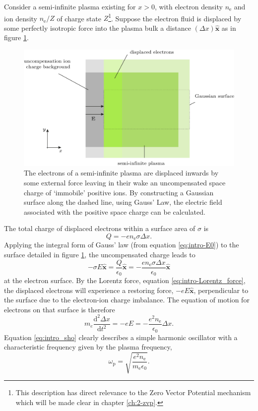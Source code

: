 Consider a semi-infinite plasma existing for $x>0$, with electron density $n_\mathrm{e}$ and ion density $n_\mathrm{e}/Z$ of charge state $Z$\footnote{This description has direct relevance to the Zero Vector Potential mechanism which will be made clear in chapter \ref{ch:2-zvp}.}. Suppose the electron fluid is displaced by some perfectly isotropic force into the plasma bulk a distance $(\Delta x) \hat{\mathbf{x}}$ as in figure \ref{fig:introplasmafrequency}. 
\begin{figure}
	\centering
	\includegraphics[width=0.7\linewidth]{figures/intro/intro_plasma_frequency}
	\caption[Diagram to illustrate the derivation of the plasma frequency.]{The electrons of a semi-infinite plasma are displaced inwards by some external force leaving in their wake an uncompensated space charge of `immobile' positive ions. By constructing a Gaussian surface along the dashed line, using Gauss' Law, the electric field associated with the positive space charge can be calculated.}
	\label{fig:introplasmafrequency}
\end{figure}
The total charge of displaced electrons within a surface area of $\sigma$ is 
\begin{equation}\label{eq:intro_Q}
	Q = -en_\mathrm{e}\sigma\Delta x.
\end{equation}
Applying the integral form of Gauss' law (from equation \ref{eq:intro-E0}) to the surface detailed in figure \ref{fig:introplasmafrequency}, the uncompensated charge leads to 
\begin{equation}\label{eq:intro_E}
	-\sigma E\hat{\mathbf{x}}= \frac{Q}{\epsilon_0}\hat{\mathbf{x}} = -\frac{en_\mathrm{e}\sigma\Delta x}{\epsilon_0}\hat{\mathbf{x}}
\end{equation}
at the electron surface. By the Lorentz force, equation \ref{eq:intro-Lorentz_force}, the displaced electrons will experience a restoring force, $-eE\hat{\mathbf{x}}$, perpendicular to the surface due to the electron-ion charge imbalance. The equation of motion for electrons on that surface is therefore
\begin{equation}\label{eq:intro_sho}
	m_e\frac{\mathrm{d}^2\Delta x}{\mathrm{d}t^2} = -eE = -\frac{e^2n_\mathrm{e}}{\epsilon_0}\Delta x.
\end{equation}
Equation \ref{eq:intro_sho} clearly describes a simple harmonic oscillator with a characteristic frequency given by the plasma frequency,
\begin{equation}
	\omega_\mathrm{p} = \sqrt{\frac{e^2n_\mathrm{e}}{m_\mathrm{e} \epsilon_0}}.
\end{equation}

